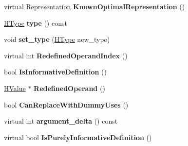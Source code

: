 \begin{DoxyCompactItemize}
\item 
virtual \hyperlink{classv8_1_1internal_1_1_representation}{Representation} {\bfseries Known\+Optimal\+Representation} ()\hypertarget{classv8_1_1internal_1_1_h_value_a1a9124133ef14af8191e77462be69046}{}\label{classv8_1_1internal_1_1_h_value_a1a9124133ef14af8191e77462be69046}

\item 
\hyperlink{classv8_1_1internal_1_1_h_type}{H\+Type} {\bfseries type} () const \hypertarget{classv8_1_1internal_1_1_h_value_a17fac9b0e7f989106d211e4f0195212f}{}\label{classv8_1_1internal_1_1_h_value_a17fac9b0e7f989106d211e4f0195212f}

\item 
void {\bfseries set\+\_\+type} (\hyperlink{classv8_1_1internal_1_1_h_type}{H\+Type} new\+\_\+type)\hypertarget{classv8_1_1internal_1_1_h_value_a57a9f1c0433e823e48adaa392c80332e}{}\label{classv8_1_1internal_1_1_h_value_a57a9f1c0433e823e48adaa392c80332e}

\item 
virtual int {\bfseries Redefined\+Operand\+Index} ()\hypertarget{classv8_1_1internal_1_1_h_value_ac971c53579e54bcbe2c56dc55a64d1c2}{}\label{classv8_1_1internal_1_1_h_value_ac971c53579e54bcbe2c56dc55a64d1c2}

\item 
bool {\bfseries Is\+Informative\+Definition} ()\hypertarget{classv8_1_1internal_1_1_h_value_ae4a9a834b498e8a6cc3d2d13e6fcab7f}{}\label{classv8_1_1internal_1_1_h_value_ae4a9a834b498e8a6cc3d2d13e6fcab7f}

\item 
\hyperlink{classv8_1_1internal_1_1_h_value}{H\+Value} $\ast$ {\bfseries Redefined\+Operand} ()\hypertarget{classv8_1_1internal_1_1_h_value_aa62dcb5ce1cba8b6a7fa5de865cba792}{}\label{classv8_1_1internal_1_1_h_value_aa62dcb5ce1cba8b6a7fa5de865cba792}

\item 
bool {\bfseries Can\+Replace\+With\+Dummy\+Uses} ()\hypertarget{classv8_1_1internal_1_1_h_value_ae88961ddb60ba63b489483abf7ac75c0}{}\label{classv8_1_1internal_1_1_h_value_ae88961ddb60ba63b489483abf7ac75c0}

\item 
virtual int {\bfseries argument\+\_\+delta} () const \hypertarget{classv8_1_1internal_1_1_h_value_a523acb7587085f48f394100d98556ed8}{}\label{classv8_1_1internal_1_1_h_value_a523acb7587085f48f394100d98556ed8}

\item 
virtual bool {\bfseries Is\+Purely\+Informative\+Definition} ()\hypertarget{classv8_1_1internal_1_1_h_value_ac9ff17d1da66077ac69a3e2f10c18853}{}\label{classv8_1_1internal_1_1_h_value_ac9ff17d1da66077ac69a3e2f10c18853}


\end{DoxyCompactItemize}
